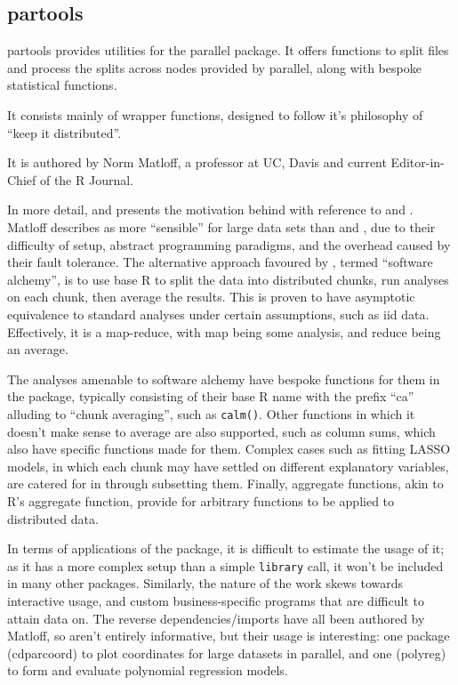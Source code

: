 \hypertarget{sec:partools}{%
    \subsection{partools}\label{sec:partools}}

partools provides utilities for the parallel
package\cite{matloff16softw_alchemy}. It offers functions to split
files and process the splits across nodes provided by parallel, along
with bespoke statistical functions.

It consists mainly of wrapper functions, designed to follow it's
philosophy of ``keep it distributed''.

It is authored by Norm Matloff, a professor at UC, Davis and current
Editor-in-Chief of the R Journal.

In more detail, \cite{matloff15} and \cite{matloff17} presents the
motivation behind  with reference to  and . Matloff
describes  as more ``sensible'' for large data sets than 
and , due to their difficulty of setup, abstract programming
paradigms, and the overhead caused by their fault tolerance. The
alternative approach favoured by , termed ``software alchemy'',
is to use base R to split the data into distributed chunks, run analyses
on each chunk, then average the results. This is proven to have
asymptotic equivalence to standard analyses under certain assumptions,
such as iid data. Effectively, it is a map-reduce, with map being some
analysis, and reduce being an average.

The analyses amenable to software alchemy have bespoke functions for
them in the package, typically consisting of their base R name with the
prefix ``ca'' alluding to ``chunk averaging'', such as
\texttt{calm()}. Other functions in which it
doesn't make sense to average are also supported, such as column sums,
which also have specific functions made for them. Complex cases such as
fitting LASSO models, in which each chunk may have settled on different
explanatory variables, are catered for in  through subsetting
them. Finally, aggregate functions, akin to R's aggregate function,
provide for arbitrary functions to be applied to distributed data.

In terms of applications of the package, it is difficult to estimate the
usage of it; as it has a more complex setup than a simple
\texttt{library} call, it won't be included in many other packages.
Similarly, the nature of the work skews towards interactive usage, and
custom business-specific programs that are difficult to attain data on.
The reverse dependencies/imports have all been authored by Matloff, so
aren't entirely informative, but their usage is interesting: one package
(cdparcoord) to plot coordinates for large datasets in parallel, and one
(polyreg) to form and evaluate polynomial regression models.

